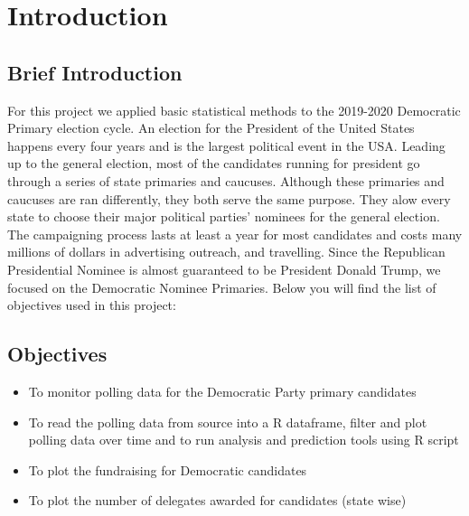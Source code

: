 \section{Introduction}
\subsection{Brief Introduction}
For this project we applied basic statistical methods to the 2019-2020 Democratic Primary election cycle. An election for the President of the United States happens every four years and is the largest political event in the USA. Leading up to the general election, most of the candidates running for president go through a series of state primaries and caucuses. Although these primaries and caucuses are ran differently, they both serve the same purpose. They alow every state to choose their major political parties’ nominees for the general election\cite{usagov}. The campaigning process lasts at least a year for most candidates and costs many millions of dollars in advertising outreach, and travelling. Since the Republican Presidential Nominee is almost guaranteed to be President Donald Trump, we focused on the Democratic Nominee Primaries. Below you will find the list of objectives used in this project:

\subsection{Objectives}
\begin{itemize}
    \item To monitor polling data for the Democratic Party primary candidates
    \item To read the polling data from source into a R dataframe, filter and plot polling data over time and to run analysis and prediction tools using R script 
    \item To plot the fundraising for Democratic candidates
    \item To plot the number of delegates awarded for candidates (state wise)
\end{itemize}


